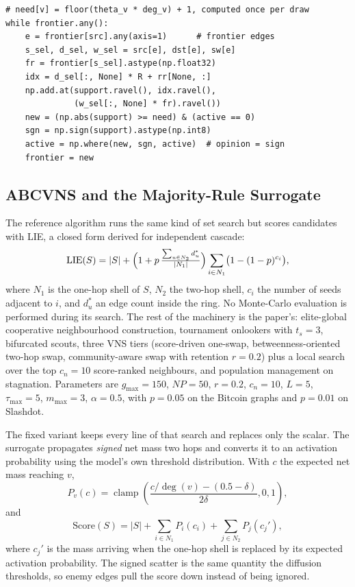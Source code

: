 \documentclass[journal,letterpaper,10pt]{IEEEtran}
\begin{document}
\begin{lstlisting}[style=pycode,caption={One diffusion round over all $R$ draws (CPU path; the GPU path is the same scatter).},label={lst:diff}]
# need[v] = floor(theta_v * deg_v) + 1, computed once per draw
while frontier.any():
    e = frontier[src].any(axis=1)      # frontier edges
    s_sel, d_sel, w_sel = src[e], dst[e], sw[e]
    fr = frontier[s_sel].astype(np.float32)
    idx = d_sel[:, None] * R + rr[None, :]
    np.add.at(support.ravel(), idx.ravel(),
              (w_sel[:, None] * fr).ravel())
    new = (np.abs(support) >= need) & (active == 0)
    sgn = np.sign(support).astype(np.int8)
    active = np.where(new, sgn, active)  # opinion = sign
    frontier = new
\end{lstlisting}

\subsection{ABCVNS and the Majority-Rule Surrogate}

The reference algorithm \cite{tang2026} runs the same kind of set search but scores candidates with LIE, a closed form derived for independent cascade:
\begin{equation}
\mathrm{LIE}(S)=|S|+\Bigl(1+p\,\tfrac{\sum_{u\in N_2}d_u^{*}}{|N_1|}\Bigr)
\sum_{i\in N_1}\bigl(1-(1-p)^{c_i}\bigr),
\label{eq:lie}
\end{equation}
where $N_1$ is the one-hop shell of $S$, $N_2$ the two-hop shell, $c_i$ the number of seeds adjacent to $i$, and $d_u^{*}$ an edge count inside the ring. No Monte-Carlo evaluation is performed during its search. The rest of the machinery is the paper's: elite-global cooperative neighbourhood construction, tournament onlookers with $t_s=3$, bifurcated scouts, three VNS tiers (score-driven one-swap, betweenness-oriented two-hop swap, community-aware swap with retention $r=0.2$) plus a local search over the top $c_n=10$ score-ranked neighbours, and population management on stagnation. Parameters are $g_{\max}=150$, $NP=50$, $r=0.2$, $c_n=10$, $L=5$, $\tau_{\max}=5$, $m_{\max}=3$, $\alpha=0.5$, with $p=0.05$ on the Bitcoin graphs and $p=0.01$ on Slashdot.

The fixed variant keeps every line of that search and replaces only the scalar. The surrogate propagates \emph{signed} net mass two hops and converts it to an activation probability using the model's own threshold distribution. With $c$ the expected net mass reaching $v$,
\begin{equation}
P_v(c)=\operatorname{clamp}\!\left(\frac{c/\deg(v)-(0.5-\delta)}{2\delta},0,1\right),
\label{eq:prob}
\end{equation}
and
\begin{equation}
\mathrm{Score}(S)=|S|+\sum_{i\in N_1}P_i(c_i)+\sum_{j\in N_2}P_j(c_j'),
\label{eq:mr}
\end{equation}
where $c_j'$ is the mass arriving when the one-hop shell is replaced by its expected activation probability. The signed scatter is the same quantity the diffusion thresholds, so enemy edges pull the score down instead of being ignored.
\end{document}
